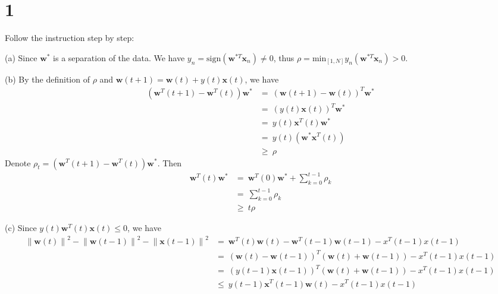 \documentclass{article}
\begin{document}
\maketitle
\section{1 }
\def\vw{{\mathbf w}}
\def\vx{{\mathbf x}}
\newcommand{\mol}[1]{\left\|#1\right\|}
Follow the instruction step by step:
\begin{tlist}{4}
	\item[(a)]
	Since $\vw^*$ is a separation of the data. We have $y_n = \text{sign}(\vw^{*T}\vx_n)\neq 0$, thus $\rho = \text{min}_{[1,N]}y_n(\vw^{*T}\vx_n) > 0$.
	\item[(b)]
	By the definition of $\rho$ and $\vw(t+1)=\vw(t)+y(t)\vx(t)$, we have
	\begin{align*}
		\left(\vw^T(t+1)-\vw^T(t)\right)\vw^*
		 & =\ \left(\vw(t+1)-\vw(t)\right)^T\vw^* \\
		 & =\ \left(y(t)\vx(t)\right)^T\vw^*      \\
		 & =\ y(t)\vx^T(t)\vw^*                   \\
		 & =\ y(t)\left(\vw^*\vx^T(t)\right)      \\
		 & \geq\ \rho
	\end{align*}
	Denote $\rho_t = \left(\vw^T(t+1)-\vw^T(t)\right)\vw^*$. Then
	\begin{align*}
		\vw^T(t)\vw^*
		 & =\ \vw^T(0)\vw^* + \sum_{k=0}^{t-1}\rho_k \\
		 & =\ \sum_{k=0}^{t-1}\rho_k                 \\
		 & \geq\ t\rho
	\end{align*}
	\item[(c)]
	Since $y(t)\vw^T(t)\vx(t) \leq 0$, we have
	\begin{align*}
		\mol{\vw(t)}^2 - \mol{\vw(t-1)}^2 - \mol{\vx(t-1)}^2
		 & =\ \vw^T(t)\vw(t) - \vw^T(t-1)\vw(t-1) - x^T(t-1)x(t-1)                        \\
		 & =\ \left(\vw(t)-\vw(t-1)\right)^T\left(\vw(t)+\vw(t-1)\right) - x^T(t-1)x(t-1) \\
		 & =\ \left(y(t-1)\vx(t-1)\right)^T\left(\vw(t)+\vw(t-1)\right)  - x^T(t-1)x(t-1) \\
		 & \leq\ y(t-1)\vx^T(t-1)\vw(t) - x^T(t-1)x(t-1)                                  \\

\end{align*}
\end{tlist}
\end{document}
